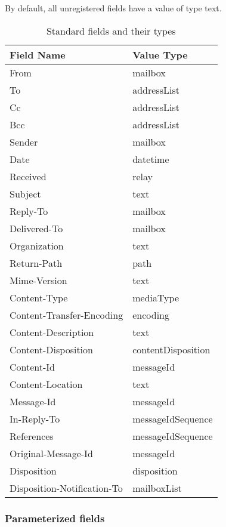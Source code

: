 By default, all unregistered fields have a value of type {\vcode text}.

\begin{table}[!ht]
\begin{center}
\noindent\begin{tabularx}{0.85\textwidth}{|X|X|}
\hline
	{\bf Field Name} &
	{\bf Value Type} \\
\hline
\hline
From & mailbox \\
To & addressList \\
Cc & addressList \\
Bcc & addressList \\
Sender & mailbox \\
Date & datetime \\
Received & relay \\
Subject & text \\
Reply-To & mailbox \\
Delivered-To & mailbox \\
Organization & text \\
Return-Path & path \\
Mime-Version & text \\
Content-Type & mediaType \\
Content-Transfer-Encoding & encoding \\
Content-Description & text \\
Content-Disposition & contentDisposition \\
Content-Id & messageId \\
Content-Location & text \\
Message-Id & messageId \\
In-Reply-To & messageIdSequence \\
References & messageIdSequence \\
Original-Message-Id & messageId \\
Disposition & disposition \\
Disposition-Notification-To & mailboxList \\
\hline
\end{tabularx}
\end{center}
\label{standard-fields}
\caption{Standard fields and their types}
\end{table}


\subsubsection{Parameterized fields} %

